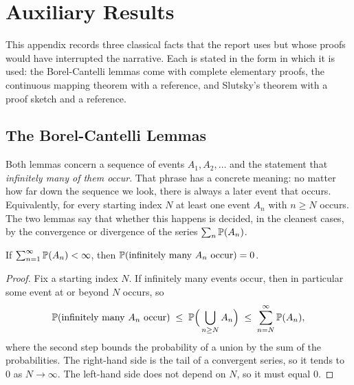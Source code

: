 
\section{Auxiliary Results}\label{app:auxiliary}

This appendix records three classical facts that the report uses but whose proofs would have interrupted the narrative. Each is stated in the form in which it is used: the Borel-Cantelli lemmas come with complete elementary proofs, the continuous mapping theorem with a reference, and Slutsky's theorem with a proof sketch and a reference.

\subsection{The Borel-Cantelli Lemmas}\label{app:borel-cantelli}

Both lemmas concern a sequence of events \(A_1, A_2, \dots\) and the statement that \emph{infinitely many of them occur}. That phrase has a concrete meaning: no matter how far down the sequence we look, there is always a later event that occurs. Equivalently, for every starting index \(N\) at least one event \(A_n\) with \(n \ge N\) occurs. The two lemmas say that whether this happens is decided, in the cleanest cases, by the convergence or divergence of the series \(\sum_n \mathbb{P}(A_n)\).

\begin{lemma}\label{lem:bc1}
If \(\sum_{n=1}^\infty \mathbb{P}(A_n) < \infty\), then
\(\mathbb{P}(\text{infinitely many } A_n \text{ occur}) = 0\).
\end{lemma}

\begin{proof}
Fix a starting index \(N\). If infinitely many events occur, then in particular some event at or beyond \(N\) occurs, so
\[
  \mathbb{P}(\text{infinitely many } A_n \text{ occur})
  \;\le\; \mathbb{P}\Bigl(\,\bigcup_{n \ge N} A_n\Bigr)
  \;\le\; \sum_{n = N}^\infty \mathbb{P}(A_n),
\]
where the second step bounds the probability of a union by the sum of the probabilities. The right-hand side is the tail of a convergent series, so it tends to \(0\) as \(N \to \infty\). The left-hand side does not depend on \(N\), so it must equal \(0\).
\end{proof}

